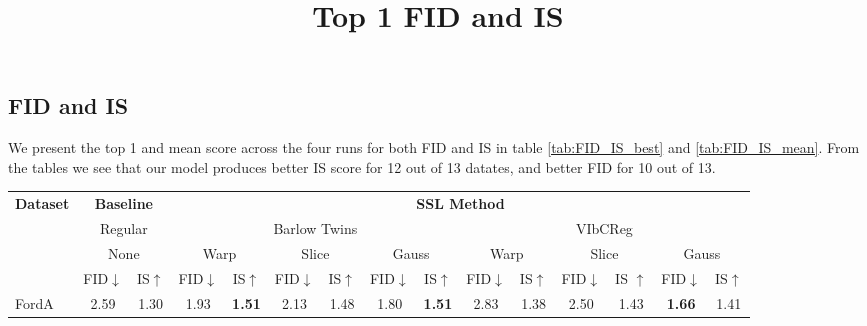 \documentclass[../../thesis.tex]{subfiles}
\begin{document}
\subsection{FID and IS}

We present the top 1 and mean score across the four runs for both FID and IS in table \ref{tab:FID_IS_best} and \ref{tab:FID_IS_mean}. From the tables we see that our model produces better IS score for 12 out of 13 datates, and better FID for 10 out of 13.\newline

\begin{table}[H]
    \title{Top 1 FID and IS}
    \centering
    \begin{adjustbox}{width=\textwidth}
     \begin{tabular}{lcc|cc|cc|cc|cc|cc|cc} %
        \toprule
        \multirow{4}{*}{\textbf{Dataset}} & \multicolumn{2}{c}{\textbf{Baseline}} & \multicolumn{12}{c}{\textbf{SSL Method}} \\
                                            \cmidrule(lr){2-3} \cmidrule(lr){4-15}
                                          & \multicolumn{2}{c}{Regular}           & \multicolumn{6}{c}{Barlow Twins}                                                 &  \multicolumn{6}{c}{VIbCReg} \\
                                          \cmidrule(lr){2-3} \cmidrule(lr){4-9} \cmidrule(lr){10-15}
                                          &   \multicolumn{2}{c}{None}            & \multicolumn{2}{c}{Warp}  & \multicolumn{2}{c}{Slice} & \multicolumn{2}{c}{Gauss} & \multicolumn{2}{c}{Warp} & \multicolumn{2}{c}{Slice} & \multicolumn{2}{c}{Gauss} \\
                                          \cmidrule(lr){2-3} \cmidrule(lr){4-5} \cmidrule(lr){6-7} \cmidrule(lr){8-9} \cmidrule(lr){10-11} \cmidrule(lr){12-13}\cmidrule(lr){14-15}
                                          & FID$\downarrow$ & IS$\uparrow $                             & FID$\downarrow$ & IS$\uparrow$                  & FID$\downarrow$ & IS$\uparrow$                & FID$\downarrow$ & IS$\uparrow$                 & FID$\downarrow$ & IS$\uparrow$                 & FID$\downarrow$ & IS $\uparrow$                 & FID$\downarrow$ & IS$\uparrow$   \\
        \midrule
        FordA                   & 2.59 & 1.30 & 1.93 & \textbf{1.51} & 2.13 & 1.48 & 1.80 & \textbf{1.51} & 2.83 & 1.38 & 2.50 & 1.43 & \textbf{1.66} & 1.41 \\

\end{tabular}
\end{adjustbox}
\end{table}
\end{document}

